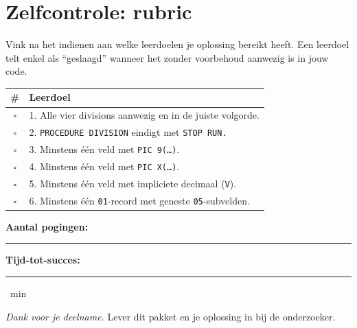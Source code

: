 \documentclass[11pt,a4paper]{article}
\begin{document}
\newpage
\section{Zelfcontrole: rubric}
\label{sec:rubric-A}

Vink na het indienen aan welke leerdoelen je oplossing bereikt heeft. 
Een leerdoel telt enkel als ``geslaagd'' wanneer het zonder voorbehoud aanwezig is in jouw code.

\begin{tabularx}{\textwidth}{|c|X|}
\hline
\textbf{\#} & \textbf{Leerdoel} \\
\hline
$\square$ & 1. Alle vier divisions aanwezig en in de juiste volgorde. \\
\hline
$\square$ & 2. \texttt{PROCEDURE DIVISION} eindigt met \texttt{STOP RUN.} \\
\hline
$\square$ & 3. Minstens één veld met \texttt{PIC 9(\ldots{})}. \\
\hline
$\square$ & 4. Minstens één veld met \texttt{PIC X(\ldots{})}. \\
\hline
$\square$ & 5. Minstens één veld met impliciete decimaal (\texttt{V}). \\
\hline
$\square$ & 6. Minstens één \texttt{01}-record met geneste \texttt{05}-subvelden. \\
\hline
\end{tabularx}

\bigskip
\noindent\textbf{Aantal pogingen:}\ \rule{2cm}{0.4pt} \hfill \textbf{Tijd-tot-succes:}\ \rule{2cm}{0.4pt}~min

\bigskip
\noindent\textit{Dank voor je deelname.} Lever dit pakket en je oplossing in bij de onderzoeker.
\end{document}
